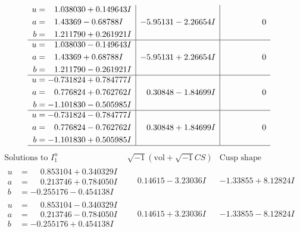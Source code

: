 \documentclass[1p]{elsarticle_modified}
\theoremstyle{definition}
\newcommand{\I}{\sqrt{-1}}
\begin{document}
$$\begin{array}{c|c|c}
\begin{aligned}
u &= \phantom{-}1.038030 + 0.149643 I \\
a &= \phantom{-}1.43369 - 0.68788 I \\
b &= \phantom{-}1.211790 + 0.261921 I\end{aligned}
 & -5.95131 - 2.26654 I & \phantom{-0.000000 } 0 \\ \hline\begin{aligned}
u &= \phantom{-}1.038030 - 0.149643 I \\
a &= \phantom{-}1.43369 + 0.68788 I \\
b &= \phantom{-}1.211790 - 0.261921 I\end{aligned}
 & -5.95131 + 2.26654 I & \phantom{-0.000000 } 0 \\ \hline\begin{aligned}
u &= -0.731824 + 0.784777 I \\
a &= \phantom{-}0.776824 + 0.762762 I \\
b &= -1.101830 - 0.505985 I\end{aligned}
 & \phantom{-}0.30848 - 1.84699 I & \phantom{-0.000000 } 0 \\ \hline\begin{aligned}
u &= -0.731824 - 0.784777 I \\
a &= \phantom{-}0.776824 - 0.762762 I \\
b &= -1.101830 + 0.505985 I\end{aligned}
 & \phantom{-}0.30848 + 1.84699 I & \phantom{-0.000000 } 0\\
 \hline 
 \end{array}$$\newpage$$\begin{array}{c|c|c}  
\text{Solutions to }I^u_{1}& \I (\text{vol} + \sqrt{-1}CS) & \text{Cusp shape}\\
 \hline 
\begin{aligned}
u &= \phantom{-}0.853104 + 0.340329 I \\
a &= \phantom{-}0.213746 + 0.784050 I \\
b &= -0.255176 - 0.454138 I\end{aligned}
 & \phantom{-}0.14615 - 3.23036 I & -1.33855 + 8.12824 I \\ \hline\begin{aligned}
u &= \phantom{-}0.853104 - 0.340329 I \\
a &= \phantom{-}0.213746 - 0.784050 I \\
b &= -0.255176 + 0.454138 I\end{aligned}
 & \phantom{-}0.14615 + 3.23036 I & -1.33855 - 8.12824 I \\ \hline\begin{aligned}

\end{aligned}
\end{array}$$
\end{document}
